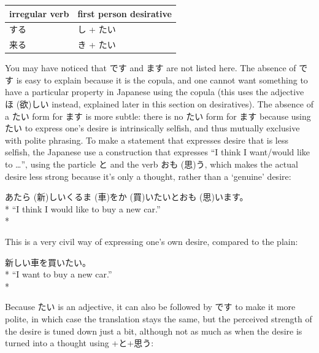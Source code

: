 \documentclass[11pt, b5paper, twoside, openright, onecolumn]{book}
\makeatletter
\newcommand*{\rubystack}[2]{{\relscale{0.5}%
  \begin{tabular}[b]{@{}c@{}}%
    {#1}\\%
   {\textscale{2}{#2}}%
  \end{tabular}}%
}
\DeclareRobustCommand*{\ruby}[2]{%
  \mbox{%
    \setlength{\parskip}{0ex}%
    \BeginAccSupp{method=pdfstringdef,ActualText={#1}}%
      \rubystack{\phantom{#2}}{#1}%
      \llap{%
        \rubystack{#2}{\phantom{#1}}%
      }%
    \EndAccSupp{}%
  }%
}
\renewcommand*{\ruby}[2]{#2 (#1)}%
\newenvironment{exampleblock}{
\setlength{\parindent}{0.6in}
\begin{minipage}[t]{\dimexpr\textwidth-\parindent}}
{\end{minipage}}
\newenvironment{mytabular}[1]{\noindent\hspace{0.4in}
\begin{tabular}[h]{#1}}{\end{tabular}}
\makeatother
\begin{document}
\smaller
\begin{mytabular}{| l  l |}\hline 
\rule{0pt}{2.4ex}irregular verb & first person desirative\\ 
\hline
\rule{0pt}{2.4ex}する & し + たい\\ 
\rule{0pt}{2.4ex}来る & き + たい\\ 
\hline 
\end{mytabular}
\larger
\vspace{0.5cm}


You may have noticed that です and ます are not listed here. The absence of です is easy to explain because it is the copula‚ and one cannot want something to have a particular property in Japanese using the copula (this uses the adjective \ruby{欲}{ほ}しい instead‚ explained later in this section on desiratives). The absence of a たい form for ます is more subtle: there is no たい form for ます because using たい to express one’s desire is intrinsically selfish‚ and thus mutually exclusive with polite phrasing. To make a statement that expresses desire that is less selfish‚ the Japanese use a construction that expresses “I think I want/would like to …”‚ using the particle と and the verb \ruby{思}{おも}う‚ which makes the actual desire less strong because it’s only a thought‚ rather than a ‘genuine’ desire:

\vspace{0.4cm}
\begin{exampleblock}
\ruby{新}{あたら}しい\ruby{車}{くるま}を\ruby{買}{か}いたいと\ruby{思}{おも}います。 \\* 
“I think I would like to buy a new car.” \\* 
\end{exampleblock}
\vspace{0.2cm}

This is a very civil way of expressing one’s own desire‚ compared to the plain:

\vspace{0.4cm}
\begin{exampleblock}
新しい車を買いたい。 \\* 
“I want to buy a new car.” \\* 
\end{exampleblock}
\vspace{0.2cm}

Because たい is an adjective‚ it can also be followed by です to make it more polite‚ in which case the translation stays the same‚ but the perceived strength of the desire is tuned down just a bit‚ although not as much as when the desire is turned into a thought using +と+思う:
\end{document}
